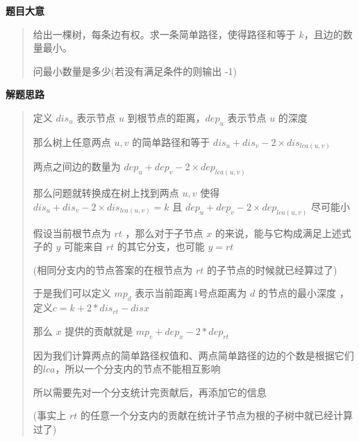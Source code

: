 \documentclass[E:/GsjzTle/main/main.tex]{subfiles}
\begin{document}
\textbf{题目大意}

\begin{quote}
给出一棵树，每条边有权。求一条简单路径，使得路径和等于
\(k\)，且边的数量最小。

问最小数量是多少(若没有满足条件的则输出 -1)
\end{quote}

\textbf{解题思路}

\begin{quote}
定义 \(dis_u\) 表示节点 \(u\) 到根节点的距离，\(dep_u\) 表示节点 \(u\)
的深度

那么树上任意两点 \(u , v\) 的简单路径和等于
\(dis_u + dis_v - 2 × dis_{lca(u , v)}\)

两点之间边的数量为 \(dep_u + dep_v - 2 × dep_{lca(u , v)}\)

那么问题就转换成在树上找到两点 \( u , v \) 使得
\(dis_u + dis_v - 2 × dis_{lca(u , v)} = k\) 且
\(dep_u + dep_v - 2 × dep_{lca(u , v)}\) 尽可能小

假设当前根节点为 \(rt\) ，那么对于子节点 \(x\)
的来说，能与它构成满足上述式子的 \(y\) 可能来自 \(rt\)
的其它分支，也可能 \(y = rt\)

(相同分支内的节点答案的在根节点为 \(rt\) 的子节点的时候就已经算过了)

于是我们可以定义 \(mp_d\) 表示当前距离\(1\)号点距离为 \(d\)
的节点的最小深度 ， 定义\(c = k+2 * dis_{rt} - dis{x}\)

那么 \(x\) 提供的贡献就是 \(mp_c + dep_x - 2 * dep_{rt}\)

因为我们计算两点的简单路径权值和、两点简单路径的边的个数是根据它们的\(lca\)，所以一个分支内的节点不能相互影响

所以需要先对一个分支统计完贡献后，再添加它的信息

(事实上 \(rt\)
的任意一个分支内的贡献在统计子节点为根的子树中就已经计算过了)
\end{quote}
\end{document}
